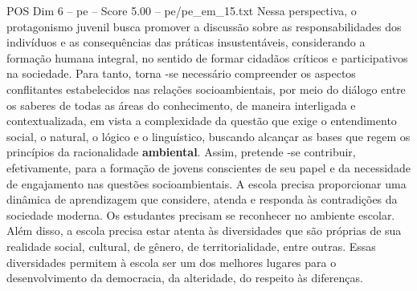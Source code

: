 \begin{textsample}{POS Dim 6 – pe – Score 5.00 – pe/pe\_em\_15.txt}
Nessa perspectiva, o protagonismo juvenil busca promover a discussão sobre as responsabilidades dos indivíduos e as consequências das práticas insustentáveis, considerando a formação humana integral, no sentido de formar cidadãos críticos e participativos na sociedade.
Para tanto, torna -se necessário compreender os aspectos conflitantes estabelecidos nas relações socioambientais, por meio do diálogo entre os saberes de todas as áreas do conhecimento, de maneira interligada e contextualizada, em vista a complexidade da questão que exige o entendimento social, o natural, o lógico e o linguístico, buscando alcançar as bases que regem os princípios da racionalidade \textbf{ambiental}.
Assim, pretende -se contribuir, efetivamente, para a formação de jovens conscientes de seu papel e da necessidade de engajamento nas questões socioambientais.
A escola precisa proporcionar uma dinâmica de aprendizagem que considere, atenda e responda às contradições da sociedade moderna.
Os estudantes precisam se reconhecer no ambiente escolar.
Além disso, a escola precisa estar atenta às diversidades que são próprias de sua realidade social, cultural, de gênero, de territorialidade, entre outras.
Essas diversidades permitem à escola ser um dos melhores lugares para o desenvolvimento da democracia, da alteridade, do respeito às diferenças.

\end{textsample}
